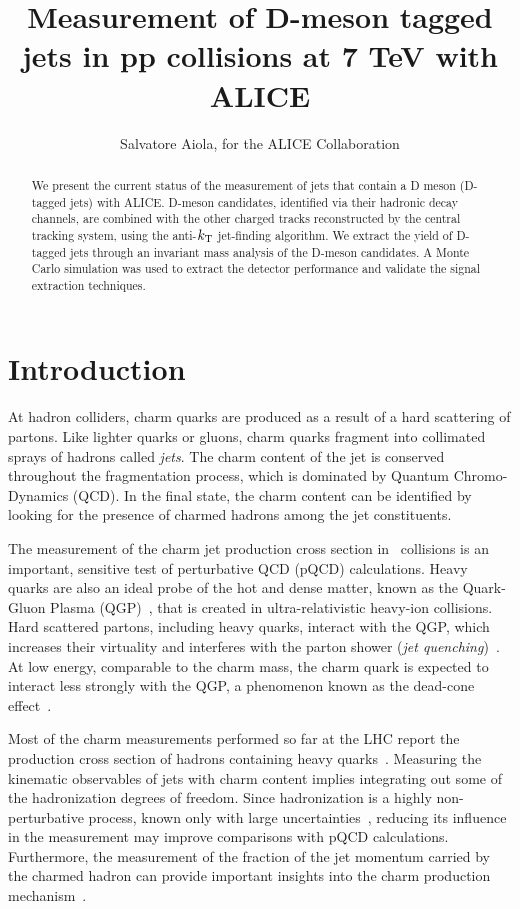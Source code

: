 \documentclass[a4paper]{jpconf}
\begin{document}
\title{Measurement of D-meson tagged jets in pp collisions at 7 TeV with ALICE}

\author{Salvatore Aiola, for the ALICE Collaboration}

\address{Physics Department, Yale University, 266 Whitney Avenue, New Haven, CT 06511}


\begin{abstract}
We present the current status of the measurement of jets that contain a D meson (D-tagged jets) with \mbox{ALICE}.
D-meson candidates, identified via their hadronic decay channels, are combined with the other charged tracks reconstructed by the central tracking system, 
using the anti-$k_{\rm T}$ jet-finding algorithm.
We extract the yield of D-tagged jets through an invariant mass analysis of the D-meson candidates.
A Monte Carlo simulation was used to extract the detector performance and validate the signal extraction techniques.
\end{abstract}

\section{Introduction}
At hadron colliders, charm quarks are produced as a result of a hard scattering of partons. Like lighter quarks or gluons, charm quarks
fragment into collimated sprays of hadrons called \emph{jets}. The charm content of the jet is conserved throughout the fragmentation process,
which is dominated by Quantum Chromo-Dynamics (QCD).
In the final state, the charm content can be identified by looking for the presence of charmed hadrons among the jet constituents.

The measurement of the charm jet production cross section in \pp\ collisions is an important, sensitive test of perturbative QCD (pQCD) calculations.
Heavy quarks are also an ideal probe of the hot and dense matter, 
known as the Quark-Gluon Plasma (QGP)~\cite{STAR:2005a, PHENIX:2005a}, 
that is created in ultra-relativistic heavy-ion collisions. 
Hard scattered partons, including heavy quarks, interact with the QGP, which increases their virtuality and interferes with the
parton shower (\emph{jet quenching})~\cite{PHENIX:2008b, CMS:2012b, ALICE:2015a}.
At low energy, comparable to the charm mass, the charm quark is expected
to interact less strongly with the QGP, a phenomenon known as the dead-cone effect~\cite{Dokshitzer:2001}.

Most of the charm measurements performed so far at the LHC report the production cross section of hadrons
containing heavy quarks~\cite{ALICE:2012d, LHCb:2013a, ATLAS:2016a, ALICE:2016b}.
Measuring the kinematic observables of jets with charm content implies integrating out some of the hadronization degrees of freedom. 
Since hadronization is a highly non-perturbative process, known only with large uncertainties~\cite{dEnterria:2014}, 
reducing its influence in the measurement may improve comparisons with pQCD calculations.
Furthermore, the measurement of the fraction of the jet momentum carried 
by the charmed hadron can provide important insights into the charm production mechanism~\cite{CDF:1990, UA1:1990, STAR:2009a, ATLAS:2012d}.
\end{document}
